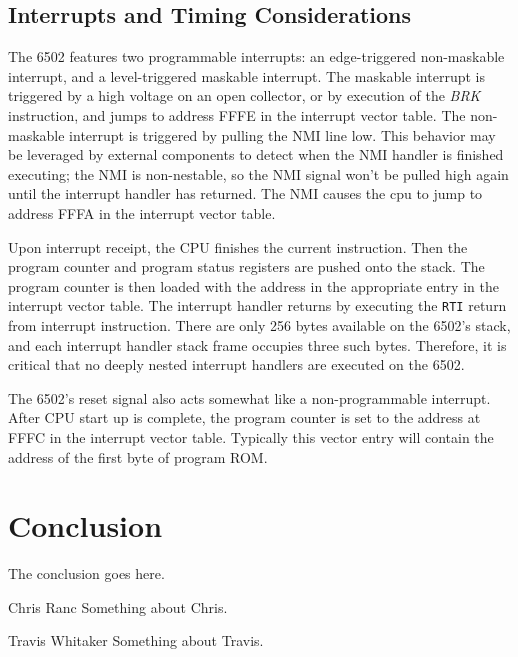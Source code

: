 \documentclass[journal]{IEEEtran}
\begin{document}
\subsection{Interrupts and Timing Considerations}

The 6502 features two programmable interrupts: an edge-triggered non-maskable
interrupt, and a level-triggered maskable interrupt. The maskable interrupt
is triggered by a high voltage on an open collector, or by execution of the
\emph{BRK} instruction, and jumps to address FFFE in the interrupt vector table.
The non-maskable interrupt is triggered by pulling the NMI line low. This
behavior may be leveraged by external components to detect when the NMI handler
is finished executing; the NMI is non-nestable, so the NMI signal won't be
pulled high again until the interrupt handler has returned. The NMI causes the
cpu to jump to address FFFA in the interrupt vector table.

Upon interrupt receipt, the CPU finishes the current instruction. Then the
program counter and program status registers are pushed onto the stack. The
program counter is then loaded with the address in the appropriate entry in the
interrupt vector table. The interrupt handler returns by executing the
\texttt{RTI} return from interrupt instruction. There are only 256 bytes
available on the 6502's stack, and each interrupt handler stack frame occupies
three such bytes. Therefore, it is critical that no deeply nested interrupt
handlers are executed on the 6502.

The 6502's reset signal also acts somewhat like a non-programmable interrupt.
After CPU start up is complete, the program counter is set to the address at
FFFC in the interrupt vector table. Typically this vector entry will contain
the address of the first byte of program ROM.

\section{Conclusion}
The conclusion goes here.


\begin{IEEEbiographynophoto}{Chris Ranc}
Something about Chris.
\end{IEEEbiographynophoto}

\begin{IEEEbiographynophoto}{Travis Whitaker}
Something about Travis.
\end{IEEEbiographynophoto}
\end{document}
